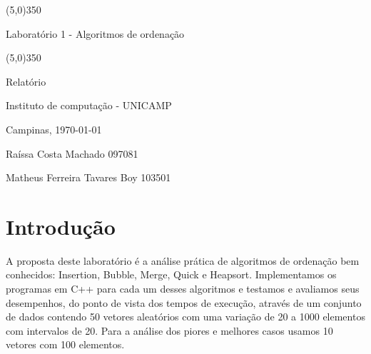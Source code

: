 \documentclass[10pt,a4paper]{article}
\begin{document}
    \begin{titlepage}
        \begin{center} \line(5,0){350} \end{center}
        \begin{center} \huge{Laboratório 1 - Algoritmos de ordenação} \end{center}
        \begin{center} \line(5,0){350} \end{center}
        \vspace{5cm}
        \begin{center} \large{Relatório} \end{center}
        \begin{center} \large{Instituto de computação - UNICAMP} \end{center}
        \begin{center} Campinas, \today \end{center}
        \vspace{3cm}
        \begin{center} \large{Raíssa Costa Machado 097081} \end{center}
        \begin{center} \large{Matheus Ferreira Tavares Boy 103501} \end{center}


        
    \end{titlepage}
    \tableofcontents
    \clearpage
    

        
\section{Introdução}
A proposta deste laboratório é a análise prática de algoritmos de ordenação bem conhecidos: 
Insertion, Bubble, Merge, Quick e Heapsort. Implementamos os programas em C++ para cada um
desses algoritmos e testamos e avaliamos seus desempenhos, do ponto de vista dos tempos de
execução, através de um conjunto de dados contendo 50 vetores aleatórios com uma variação
de 20 a 1000 elementos com intervalos de 20. Para a análise dos piores e melhores casos
usamos 10 vetores com 100 elementos.
\end{document}

